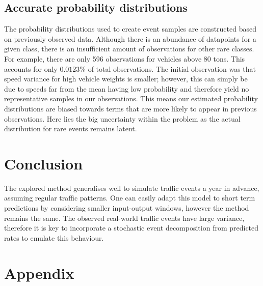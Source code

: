 \documentclass[10pt,conference,compsocconf]{IEEEtran}
\begin{document}
\subsection{Accurate probability distributions}
The probability distributions used to create event samples are constructed based on previously observed data. Although there is an abundance of datapoints for a given class, there is an insufficient amount of observations for other rare classes. For example, there are only 596 observations for vehicles above 80 tons. This accounts for only $0.0123\%$ of total observations. The initial observation was that speed variance for high vehicle weights is smaller; however, this can simply be due to speeds far from the mean having low probability and therefore yield no representative samples in our observations. This means our estimated probability distributions are biased towards terms that are more likely to appear in previous observations. Here lies the big uncertainty within the problem as the actual distribution for rare events remains latent.



\section{Conclusion}

The explored method generalises well to simulate traffic events a year in advance, assuming regular traffic patterns. One can easily adapt this model to short term predictions by considering smaller input-output windows, however the method remains the same. The observed real-world traffic events have large variance, therefore it is key to incorporate a stochastic event decomposition from predicted rates to emulate this behaviour. 






\newpage
\section*{Appendix}
\end{document}
